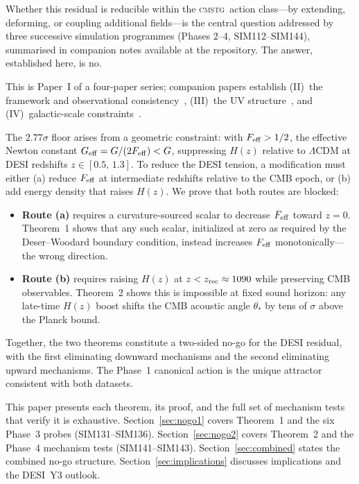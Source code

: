 \documentclass[12pt,a4paper]{article}
\newcommand{\CMSTG}{\textsc{cmstg}}
\newcommand{\Feff}{F_{\rm eff}}
\newcommand{\thetastar}{\theta_*}
\theoremstyle{plain}
\begin{document}
Whether this residual is reducible within the \CMSTG\ action class---by
extending, deforming, or coupling additional fields---is the central question
addressed by three successive simulation programmes (Phases 2--4, SIM112--SIM144),
summarised in companion notes available at the repository.
The answer, established here, is no.

This is Paper~I of a four-paper series; companion papers establish
(II)~the framework and observational consistency~\cite{WilsonPaperII},
(III)~the UV structure~\cite{WilsonPaperIII}, and (IV)~galactic-scale
constraints~\cite{WilsonPaperIV}.

The $2.77\sigma$ floor arises from a geometric constraint: with $\Feff > 1/2$,
the effective Newton constant $G_{\rm eff} = G/(2\Feff) < G$, suppressing $H(z)$
relative to $\Lambda$CDM at DESI redshifts $z\in[0.5,\,1.3]$. To reduce the
DESI tension, a modification must either (a) reduce $\Feff$ at intermediate
redshifts relative to the CMB epoch, or (b) add energy density that raises
$H(z)$. We prove that both routes are blocked:
\begin{itemize}
  \item \textbf{Route (a)} requires a curvature-sourced scalar to decrease
        $\Feff$ toward $z=0$. Theorem~1 shows that any such scalar, initialized
        at zero as required by the Deser--Woodard boundary condition, instead
        increases $\Feff$ monotonically---the wrong direction.
  \item \textbf{Route (b)} requires raising $H(z)$ at $z<z_{\rm rec}\approx
        1090$ while preserving CMB observables. Theorem~2 shows this is
        impossible at fixed sound horizon: any late-time $H(z)$ boost shifts
        the CMB acoustic angle $\thetastar$ by tens of $\sigma$ above the
        Planck bound.
\end{itemize}

Together, the two theorems constitute a two-sided no-go for the DESI residual,
with the first eliminating downward mechanisms and the second eliminating upward
mechanisms. The Phase~1 canonical action is the unique attractor consistent
with both datasets.

This paper presents each theorem, its proof, and the full set of mechanism
tests that verify it is exhaustive. Section~\ref{sec:nogo1} covers Theorem~1
and the six Phase~3 probes (SIM131--SIM136). Section~\ref{sec:nogo2} covers
Theorem~2 and the Phase~4 mechanism tests (SIM141--SIM143). Section~\ref{sec:combined}
states the combined no-go structure. Section~\ref{sec:implications} discusses
implications and the DESI~Y3 outlook.
\end{document}
